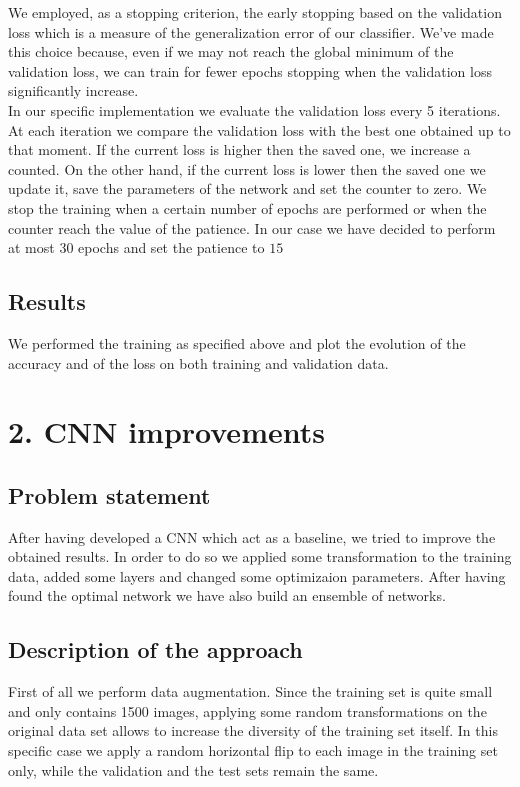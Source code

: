 \documentclass[12pt, a4paper]{report}
\begin{document}
We employed, as a stopping criterion, the early stopping based on the validation loss which is a measure of the generalization error of our classifier. We've made this choice because, even if we may not reach the global minimum of the validation loss, we can train for fewer epochs stopping when the validation loss significantly increase.\\
In our specific implementation we evaluate the validation loss every 5 iterations. At each iteration we compare the validation loss with the best one obtained up to that moment. If the current loss is higher then the saved one, we increase a counted. On the other hand, if the current loss is lower then the saved one we update it, save the parameters of the network and set the counter to zero. We stop the training when a certain number of epochs are performed or when the counter reach the value of the patience. In our case we have decided to perform at most $30$ epochs and set the patience to $15$
	
\subsection*{Results}

We performed the training as specified above and plot the evolution of the accuracy and of the loss on both training and validation data.

\begin{figure}[h!]
	\centering
	\label{fig:baselineaccuracy}
	\label{fig:baselineloss}
\end{figure}

\section*{2. CNN improvements}
\subsection*{Problem statement}
After having developed a CNN which act as a baseline, we tried to improve the obtained results. In order to do so we applied some transformation to the training data, added some layers and changed some optimizaion parameters. After having found the optimal network we have also build an ensemble of networks.

\subsection*{Description of the approach}
First of all we perform data augmentation. Since the training set is quite small and only contains 1500 images, applying some random transformations on the original data set allows to increase the diversity of the training set itself. In this specific case we apply a random horizontal flip to each image in the training set only, while the validation and the test sets remain the same.
\end{document}
